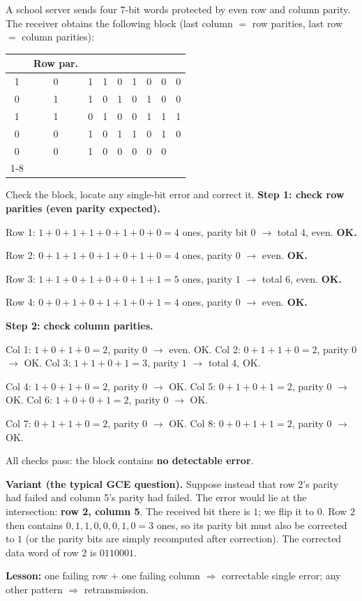 \documentclass[11pt]{article}
\begin{document}
\begin{exoresolu}
A school server sends four 7-bit words protected by even row and column parity. The receiver obtains the following block (last column $=$ row parities, last row $=$ column parities):
\begin{center}
\begin{tabular}{|c|c|c|c|c|c|c|c|c|}
\hline
\rowcolor{popblueL} \multicolumn{8}{|c|}{Data bits} & Row par. \\
\hline
1 & 0 & 1 & 1 & 0 & 1 & 0 & 0 & 0 \\
0 & 1 & 1 & 0 & 1 & 0 & 1 & 0 & 0 \\
1 & 1 & 0 & 1 & 0 & 0 & 1 & 1 & 1 \\
0 & 0 & 1 & 0 & 1 & 1 & 0 & 1 & 0 \\
\hline
0 & 0 & 1 & 0 & 0 & 0 & 0 & 0 & \multicolumn{1}{c}{} \\
\cline{1-8}
\multicolumn{9}{l}{Last row: column parities} \\
\end{tabular}
\end{center}
Check the block, locate any single-bit error and correct it.
\tcblower
\textbf{Step 1: check row parities (even parity expected).}\par
Row 1: $1+0+1+1+0+1+0+0 = 4$ ones, parity bit $0$ $\rightarrow$ total 4, even. \textbf{OK.}\par
Row 2: $0+1+1+0+1+0+1+0 = 4$ ones, parity $0$ $\rightarrow$ even. \textbf{OK.}\par
Row 3: $1+1+0+1+0+0+1+1 = 5$ ones, parity $1$ $\rightarrow$ total 6, even. \textbf{OK.}\par
Row 4: $0+0+1+0+1+1+0+1 = 4$ ones, parity $0$ $\rightarrow$ even. \textbf{OK.}\par\smallskip
\textbf{Step 2: check column parities.}\par
Col 1: $1+0+1+0 = 2$, parity $0$ $\rightarrow$ even. OK.\quad
Col 2: $0+1+1+0 = 2$, parity $0$ $\rightarrow$ OK.\quad
Col 3: $1+1+0+1 = 3$, parity $1$ $\rightarrow$ total 4, OK.\par
Col 4: $1+0+1+0 = 2$, parity $0$ $\rightarrow$ OK.\quad
Col 5: $0+1+0+1 = 2$, parity $0$ $\rightarrow$ OK.\quad
Col 6: $1+0+0+1 = 2$, parity $0$ $\rightarrow$ OK.\par
Col 7: $0+1+1+0 = 2$, parity $0$ $\rightarrow$ OK.\quad
Col 8: $0+0+1+1 = 2$, parity $0$ $\rightarrow$ OK.\par\smallskip
All checks pass: the block contains \textbf{no detectable error}.\par\smallskip
\textbf{Variant (the typical GCE question).} Suppose instead that row 2's parity had failed and column 5's parity had failed. The error would lie at the intersection: \textbf{row 2, column 5}. The received bit there is $1$; we flip it to $0$. Row 2 then contains $0,1,1,0,0,0,1,0 = 3$ ones, so its parity bit must also be corrected to $1$ (or the parity bits are simply recomputed after correction). The corrected data word of row 2 is $0110001$.\par
\textbf{Lesson:} one failing row $+$ one failing column $\Rightarrow$ correctable single error; any other pattern $\Rightarrow$ retransmission.
\end{exoresolu}
\end{document}
